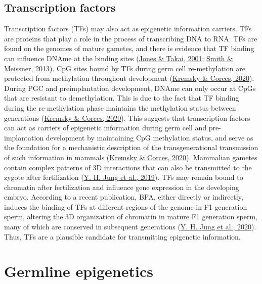 \documentclass[12pt,twoside]{reedthesis}
\begin{document}
\hypertarget{transcription-factors}{%
\subsection*{Transcription factors}\label{transcription-factors}}

Transcription factors (TFs) may also act as epigenetic information
carriers. TFs are proteins that play a role in the process of
transcribing DNA to RNA. TFs are found on the genomes of mature gametes,
and there is evidence that TF binding can influence DNAme at the binding
sites (\protect\hyperlink{ref-jones2001}{Jones \& Takai, 2001}; \protect\hyperlink{ref-smith2013}{Smith \& Meissner, 2013}). CpG sites bound by TFs during germ cell
re-methylation are protected from methylation throughout development
(\protect\hyperlink{ref-kremsky2020}{Kremsky \& Corces, 2020}). During PGC and preimplantation development, DNAme can
only occur at CpGs that are resistant to demethylation. This is due to
the fact that TF binding during the re-methylation phase maintains the
methylation status between generations (\protect\hyperlink{ref-kremsky2020}{Kremsky \& Corces, 2020}). This suggests
that transcription factors can act as carriers of epigenetic information
during germ cell and pre-implantation development by maintaining CpG
methylation status, and serve as the foundation for a mechanistic
description of the transgenerational transmission of such information in
mammals (\protect\hyperlink{ref-kremsky2020}{Kremsky \& Corces, 2020}). Mammalian gametes contain complex patterns of 3D
interactions that can also be transmitted to the zygote after
fertilization (\protect\hyperlink{ref-jung2019}{Y. H. Jung et al., 2019}). TFs may remain bound to chromatin after
fertilization and influence gene expression in the developing embryo.
According to a recent publication, BPA, either directly or indirectly,
induces the binding of TFs at different regions of the genome in F1
generation sperm, altering the 3D organization of chromatin in mature F1
generation sperm, many of which are conserved in subsequent generations
(\protect\hyperlink{ref-jung2020}{Y. H. Jung et al., 2020}). Thus, TFs are a plausible candidate for transmitting
epigenetic information.

\hypertarget{germline-epigenetics}{%
\section*{Germline epigenetics}\label{germline-epigenetics}}
\end{document}
